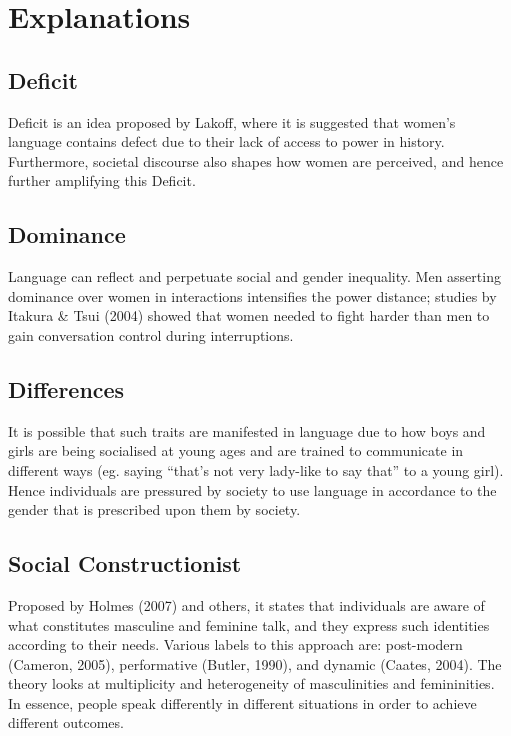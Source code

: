 \documentclass[../main.tex]{subfiles}
\begin{document}
        \section{Explanations}
            \subsection{Deficit}
            Deficit is an idea proposed by Lakoff, where it is suggested that women's language contains defect due to their lack of access to power in history. Furthermore, societal discourse also shapes how women are perceived, and hence further amplifying this Deficit. 

            \subsection{Dominance}
            Language can reflect and perpetuate social and gender inequality. Men asserting dominance over women in interactions intensifies the power distance; studies by Itakura \& Tsui (2004) showed that women needed to fight harder than men to gain conversation control during interruptions.

            \subsection{Differences}
            It is possible that such traits are manifested in language due to how boys and girls are being socialised at young ages and are trained to communicate in different ways (eg. saying ``that's not very lady-like to say that'' to a young girl). Hence individuals are pressured by society to use language in accordance to the gender that is prescribed upon them by society. 

            \subsection{Social Constructionist}
            Proposed by Holmes (2007) and others, it states that individuals are aware of what constitutes masculine and feminine talk, and they express such identities according to their needs. Various labels to this approach are: post-modern (Cameron, 2005), performative (Butler, 1990), and dynamic (Caates, 2004). The theory looks at multiplicity and heterogeneity of masculinities and femininities. In essence, people speak differently in different situations in order to achieve different outcomes.
            
\end{document}
